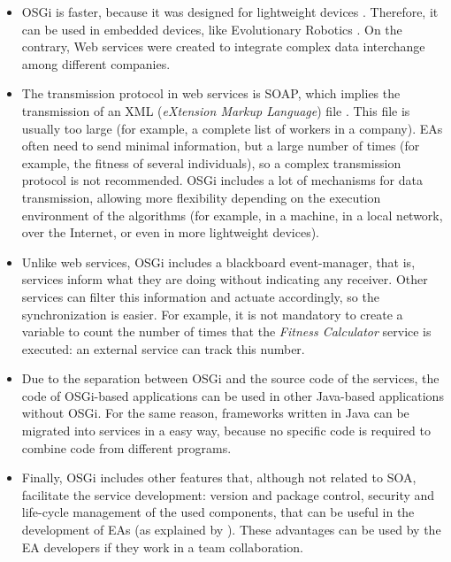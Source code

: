 \begin{itemize}

\item OSGi is faster, because it was designed for
  lightweight devices \cite{LimGateway08}. Therefore, it can be
  used in embedded devices, like Evolutionary Robotics
  \cite{Garcia2012testing}. On the contrary, Web services were created to integrate complex
  data interchange among different companies.  
\item The transmission protocol in web services is SOAP, which implies
  the transmission of an XML ({\em eXtension Markup
    Language}) file \cite{XML}. This file is usually too large (for example, a
  complete list of workers in a company). 
 EAs often need to send
  minimal information, but a large number of times (for example, the
  fitness of several individuals), so a complex transmission protocol
  is not recommended. OSGi includes a lot of mechanisms for data
  transmission, allowing more flexibility depending on the execution environment of
  the algorithms (for example, in a machine, in a local
  network, over the Internet, or even in more lightweight devices). 

 \item Unlike web services, OSGi includes a blackboard event-manager,
   that is, services inform what they are doing without indicating 
 any receiver. Other services can filter this information and actuate
 accordingly, so the synchronization is easier. For example, it is not
 mandatory to create a variable to count the number of times that the
 {\em Fitness Calculator} service is executed: an external service can track this number. 
 \item Due to the separation between OSGi and the source code of the
   services, the code of OSGi-based applications can be used in other
   Java-based applications without OSGi. For the same reason,
   frameworks written in Java can be migrated into services in a easy
   way, because no specific code is required to combine code from different programs. 
 \item Finally, OSGi includes other features that, although not related to SOA, facilitate the service development: version and package
   control, security and life-cycle management of the used
   components, that can be useful in the development of EAs 
   (as explained by  \cite{WagnerPlugins07}). These advantages can be used by the EA developers if
   they work in a team collaboration. 
\end{itemize}

